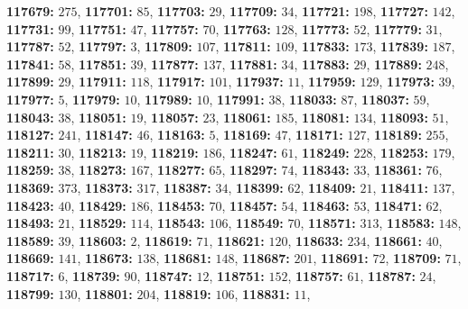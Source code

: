 \textsf{\bfseries 117679:} $275$, \textsf{\bfseries 117701:} $85$, \textsf{\bfseries 117703:} $29$, \textsf{\bfseries 117709:} $34$, \textsf{\bfseries 117721:} $198$, \textsf{\bfseries 117727:} $142$, \textsf{\bfseries 117731:} $99$, \textsf{\bfseries 117751:} $47$, \textsf{\bfseries 117757:} $70$, \textsf{\bfseries 117763:} $128$, \textsf{\bfseries 117773:} $52$, \textsf{\bfseries 117779:} $31$, \textsf{\bfseries 117787:} $52$, \textsf{\bfseries 117797:} $3$, \textsf{\bfseries 117809:} $107$, \textsf{\bfseries 117811:} $109$, \textsf{\bfseries 117833:} $173$, \textsf{\bfseries 117839:} $187$, \textsf{\bfseries 117841:} $58$, \textsf{\bfseries 117851:} $39$, \textsf{\bfseries 117877:} $137$, \textsf{\bfseries 117881:} $34$, \textsf{\bfseries 117883:} $29$, \textsf{\bfseries 117889:} $248$, \textsf{\bfseries 117899:} $29$, \textsf{\bfseries 117911:} $118$, \textsf{\bfseries 117917:} $101$, \textsf{\bfseries 117937:} $11$, \textsf{\bfseries 117959:} $129$, \textsf{\bfseries 117973:} $39$, \textsf{\bfseries 117977:} $5$, \textsf{\bfseries 117979:} $10$, \textsf{\bfseries 117989:} $10$, \textsf{\bfseries 117991:} $38$, \textsf{\bfseries 118033:} $87$, \textsf{\bfseries 118037:} $59$, \textsf{\bfseries 118043:} $38$, \textsf{\bfseries 118051:} $19$, \textsf{\bfseries 118057:} $23$, \textsf{\bfseries 118061:} $185$, \textsf{\bfseries 118081:} $134$, \textsf{\bfseries 118093:} $51$, \textsf{\bfseries 118127:} $241$, \textsf{\bfseries 118147:} $46$, \textsf{\bfseries 118163:} $5$, \textsf{\bfseries 118169:} $47$, \textsf{\bfseries 118171:} $127$, \textsf{\bfseries 118189:} $255$, \textsf{\bfseries 118211:} $30$, \textsf{\bfseries 118213:} $19$, \textsf{\bfseries 118219:} $186$, \textsf{\bfseries 118247:} $61$, \textsf{\bfseries 118249:} $228$, \textsf{\bfseries 118253:} $179$, \textsf{\bfseries 118259:} $38$, \textsf{\bfseries 118273:} $167$, \textsf{\bfseries 118277:} $65$, \textsf{\bfseries 118297:} $74$, \textsf{\bfseries 118343:} $33$, \textsf{\bfseries 118361:} $76$, \textsf{\bfseries 118369:} $373$, \textsf{\bfseries 118373:} $317$, \textsf{\bfseries 118387:} $34$, \textsf{\bfseries 118399:} $62$, \textsf{\bfseries 118409:} $21$, \textsf{\bfseries 118411:} $137$, \textsf{\bfseries 118423:} $40$, \textsf{\bfseries 118429:} $186$, \textsf{\bfseries 118453:} $70$, \textsf{\bfseries 118457:} $54$, \textsf{\bfseries 118463:} $53$, \textsf{\bfseries 118471:} $62$, \textsf{\bfseries 118493:} $21$, \textsf{\bfseries 118529:} $114$, \textsf{\bfseries 118543:} $106$, \textsf{\bfseries 118549:} $70$, \textsf{\bfseries 118571:} $313$, \textsf{\bfseries 118583:} $148$, \textsf{\bfseries 118589:} $39$, \textsf{\bfseries 118603:} $2$, \textsf{\bfseries 118619:} $71$, \textsf{\bfseries 118621:} $120$, \textsf{\bfseries 118633:} $234$, \textsf{\bfseries 118661:} $40$, \textsf{\bfseries 118669:} $141$, \textsf{\bfseries 118673:} $138$, \textsf{\bfseries 118681:} $148$, \textsf{\bfseries 118687:} $201$, \textsf{\bfseries 118691:} $72$, \textsf{\bfseries 118709:} $71$, \textsf{\bfseries 118717:} $6$, \textsf{\bfseries 118739:} $90$, \textsf{\bfseries 118747:} $12$, \textsf{\bfseries 118751:} $152$, \textsf{\bfseries 118757:} $61$, \textsf{\bfseries 118787:} $24$, \textsf{\bfseries 118799:} $130$, \textsf{\bfseries 118801:} $204$, \textsf{\bfseries 118819:} $106$, \textsf{\bfseries 118831:} $11$, 
